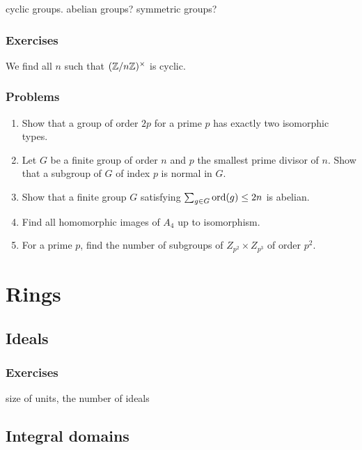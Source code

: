 \documentclass{../note}
\begin{document}
cyclic groups.
abelian groups?
symmetric groups?




\section*{Exercises}

\begin{prb}
We find all $n$ such that $(\mathbb{Z}/n\mathbb{Z})^\times$ is cyclic.
\end{prb}




\section*{Problems}

\begin{enumerate}
\item Show that a group of order $2p$ for a prime $p$ has exactly two isomorphic types.
\item Let $G$ be a finite group of order $n$ and $p$ the smallest prime divisor of $n$. Show that a subgroup of $G$ of index $p$ is normal in $G$.
\item Show that a finite group $G$ satisfying $\sum_{g\in G}\operatorname{ord}(g)\le2n$ is abelian.
\item Find all homomorphic images of $A_4$ up to isomorphism.
\item For a prime $p$, find the number of subgroups of $Z_{p^2}\times Z_{p^3}$ of order $p^2$.
\end{enumerate}







\part{Rings}
\chapter{Ideals}



\section*{Exercises}
size of units, the number of ideals




\chapter{Integral domains}
\end{document}
